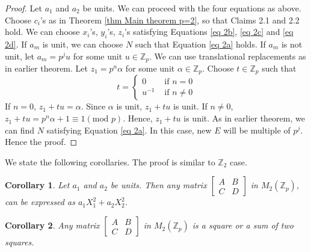 \documentclass[12pt,a4paper]{article}
\newtheorem{cor}{Corollary}[section]
\begin{document}
	\begin{proof}
		Let $a_1$ and $a_2$ be units. We can proceed with the four equations as above. Choose $c_i$'s as in Theorem \ref{thm Main theorem p=2}, so that Claims 2.1 and 2.2 hold.  We can choose $x_i$'s, $y_i$'s, $z_i$'s satisfying Equations \eqref{eq 2b}, \eqref{eq 2c} and \eqref{eq 2d}. If $a_m$ is unit, we can choose $N$ such that Equation \eqref{eq 2a} holds. If $a_m$ is not unit, let $a_m = p^ju$ for some unit $u \in \mathbb{Z}_p$. We can use translational replacements as in earlier theorem. Let $z_1=p^n \alpha$ for some unit $\alpha \in \mathbb{Z}_p$. Choose $t \in \mathbb{Z}_p$ such that
		\begin{equation*}
			t= \begin{cases}
				0 &\mbox{ if } n=0 \\
				u^{-1} &\mbox{ if } n \neq 0
			\end{cases}
		\end{equation*}
		If $n=0$, $z_1+tu = \alpha$. Since $\alpha$ is unit, $z_1 + tu$ is unit. If $n \neq 0$, $z_1+tu = p^n\alpha +1 \equiv 1 (\mbox{mod }p)$. Hence, $z_1+tu$ is unit.
		As in earlier theorem, we can find $N$ satisfying Equation \eqref{eq 2a}. In this case, new $E$ will be multiple of $p^j$. Hence the proof.  
	\end{proof}
	We state the following corollaries. The proof is similar to $\mathbb{Z}_2$ case. 
	\begin{cor}\label{Cor f(2) for odd p}
		Let $a_1$ and $a_2$ be units. Then any matrix $ \begin{bmatrix}
			A & B  \\
			C & D  
		\end{bmatrix} $ in $M_2(\mathbb{Z}_p)$, can be expressed as $a_1X_1^2 + a_2X_2^2$.
	\end{cor}
	\begin{cor} \label{Cor matrix as a  square odd p}
		Any matrix $\begin{bmatrix}
			A & B \\
			C & D
		\end{bmatrix}$ in $M_2(\mathbb{Z}_p)$ is a square or a sum of two squares.
	\end{cor}
\end{document}
